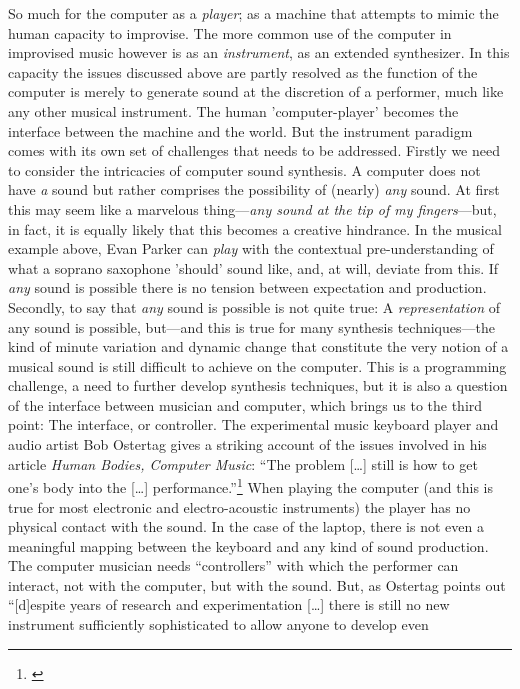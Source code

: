 So much for the computer as a \emph{player}; as a machine that
attempts to mimic the human capacity to improvise. The more common use
of the computer in improvised music however is as an
\emph{instrument}, as an extended synthesizer. In this capacity the
issues discussed above are partly resolved as the function of the
computer is merely to generate sound at the discretion of a performer,
much like any other musical instrument. The human 'computer-player'
becomes the interface between the machine and the world. But the
instrument paradigm comes with its own set of challenges that needs to
be addressed. Firstly we need to consider the intricacies of computer
sound synthesis. A computer does not have \emph{a} sound but rather
comprises the possibility of (nearly) \emph{any} sound. At first this
may seem like a marvelous thing---\emph{any sound at the tip of my
  fingers}---but, in fact, it is equally likely that this becomes a
creative hindrance. In the musical example above, Evan Parker can
\emph{play} with the contextual pre-understanding of what a soprano
saxophone 'should' sound like, and, at will, deviate from this. If
\emph{any} sound is possible there is no tension between expectation
and production. Secondly, to say that \emph{any} sound is possible is
not quite true: A \emph{representation} of any sound is possible,
but---and this is true for many synthesis techniques---the kind of
minute variation and dynamic change that constitute the very notion of
a musical sound is still difficult to achieve on the computer. This is
a programming challenge, a need to further develop synthesis
techniques, but it is also a question of the interface between
musician and computer, which brings us to the third point: The
interface, or controller. The experimental music keyboard player and
audio artist Bob Ostertag gives a striking account of the issues
involved in his article \emph{Human Bodies, Computer Music}: ``The
problem [\ldots] still is how to get one's body into the [\ldots]
performance.''\footnote{\citet{ostertag02}} When playing the computer (and
this is true for most electronic and electro-acoustic instruments) the
player has no physical contact with the sound. In the case of the
laptop, there is not even a meaningful mapping between the keyboard
and any kind of sound production. The computer musician needs
``controllers'' with which the performer can interact, not with the
computer, but with the sound. But, as Ostertag points out ``[d]espite
years of research and experimentation [\ldots] there is still no new
instrument sufficiently sophisticated to allow anyone to develop even
